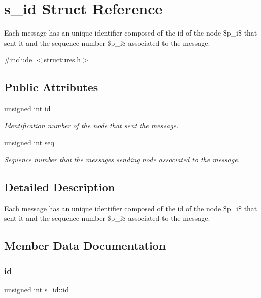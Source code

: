\hypertarget{structs__id}{}\section{s\+\_\+id Struct Reference}
\label{structs__id}


Each message has an unique identifier composed of the id of the node \$p\+\_\+i\$ that sent it and the sequence number \$p\+\_\+i\$ associated to the message.  




{\ttfamily \#include $<$structures.\+h$>$}

\subsection*{Public Attributes}
\begin{DoxyCompactItemize}
\item 
unsigned int \hyperlink{structs__id_a5c4ca3342296868576159a20ebe9909d}{id}
\begin{DoxyCompactList}\small\item\em Identification number of the node that sent the message. \end{DoxyCompactList}\item 
unsigned int \hyperlink{structs__id_aa384054b68c5bfb4ed4a230e6a0e895f}{seq}
\begin{DoxyCompactList}\small\item\em Sequence number that the message\textquotesingle{}s sending node associated to the message. \end{DoxyCompactList}\end{DoxyCompactItemize}


\subsection{Detailed Description}
Each message has an unique identifier composed of the id of the node \$p\+\_\+i\$ that sent it and the sequence number \$p\+\_\+i\$ associated to the message. 

\subsection{Member Data Documentation}
\mbox{\label{structs__id_a5c4ca3342296868576159a20ebe9909d}} 
\subsubsection{\texorpdfstring{id}{id}}
{\footnotesize\ttfamily unsigned int s\+\_\+id\+::id}




